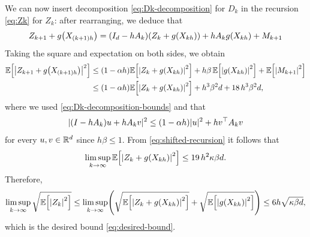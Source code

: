 \documentclass[11pt,a4paper]{article}
\begin{document}
    
    We can now insert decomposition \eqref{eq:Dk-decomposition} for $D_k$ in the recursion \eqref{eq:Zk} for $Z_k$: after rearranging, we deduce that
    \begin{equation}
        Z_{k+1}+g\tond*{X_{(k+1)h}} = (I_d -h A_k)\tond*{Z_{k}+g\tond*{X_{kh}}}+hA_k g(X_{kh}) +M_{k+1}
    \end{equation}
    Taking the square and expectation on both sides, we obtain 
    \begin{equation}
    \label{eq:shifted-recursion}
        \begin{split}
            \expe{\abs*{Z_{k+1}+g\tond*{X_{(k+1)h}}}^2} &\le (1-\alpha h)\expe{\abs*{Z_{k}+g\tond*{X_{kh}}}^2} + h\beta \,\expe{\abs*{g\tond*{X_{kh}}}^{2}} + \expe{\abs*{M_{k+1}}^{2}}\\
            &\le  (1-\alpha h)\expe{\abs*{Z_{k}+g\tond*{X_{kh}}}^2} + h^{3}\beta^{2}d + 18 \, h^{3}\beta^{2}d,
        \end{split}
    \end{equation}
    where we used \eqref{eq:Dk-decomposition-bounds}  and that
    \begin{equation*}
        \lvert(I-hA_{k})u+hA_{k}v\rvert^2
        \leq(1-\alpha h)\lvert u\rvert^2+h v^\top A_{k}v
    \end{equation*}
    for every $u,v\in\mathbb{R}^d$ since $h\beta\le 1$.
    From \eqref{eq:shifted-recursion} it follows that 
    \[
        \limsup_{k\to \infty} \expe{\abs*{Z_{k}+g\tond*{X_{kh}}}^2} \leq 19 \, h^{2} \kappa \beta d.
    \]
    Therefore, 
    \[
        \limsup_{k\to \infty} \sqrt{\expe{\abs*{Z_k}^2}} \le {\limsup_{k\to \infty} \tond*{\sqrt{\expe{\abs*{Z_{k}+g\tond*{X_{kh}}}^2}} +\sqrt{\expe{\abs*{g(X_{kh})}^2}}}} \leq 6 h \sqrt{\kappa \beta d},
    \]
    which is the desired bound \eqref{eq:desired-bound}.
    
\end{document}

